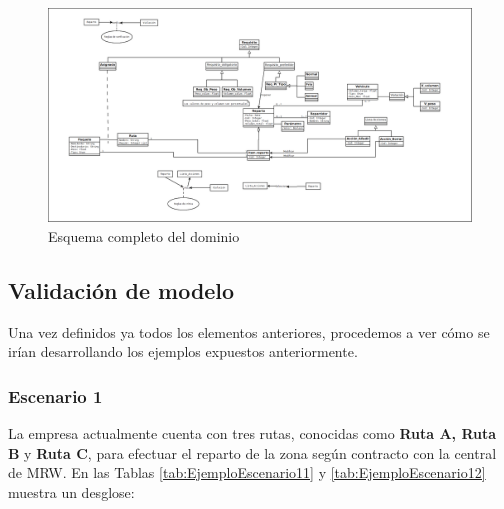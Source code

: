 \begin{figure}[H]
  \centering
  \includegraphics[scale=0.20, angle=90]{imaxes/Diagrama_Dominio_Completo.png}
  \caption{\label{fig:DominioCompleto}Esquema completo del dominio}
\end{figure}


\subsection{Validación de modelo}

Una vez definidos ya todos los elementos anteriores, procedemos a ver cómo se irían desarrollando los ejemplos expuestos anteriormente.

\subsubsection{Escenario 1}
La empresa actualmente cuenta con tres rutas, conocidas como \textbf{Ruta A, Ruta B} y \textbf{Ruta C}, para efectuar el reparto de la zona según contracto con la central de MRW. En las Tablas \ref{tab:EjemploEscenario11} y \ref{tab:EjemploEscenario12} muestra un desglose:


